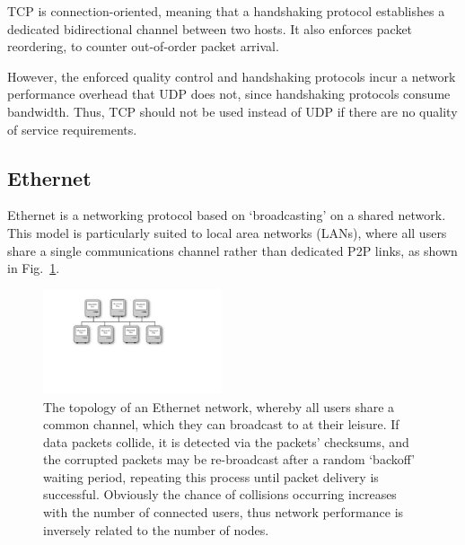 TCP is connection-oriented, meaning that a handshaking protocol establishes a dedicated bidirectional channel between two hosts. It also enforces packet reordering, to counter out-of-order packet arrival.

However, the enforced quality control and handshaking protocols incur a network performance overhead that UDP does not, since handshaking protocols consume bandwidth. Thus, TCP should not be used instead of UDP if there are no quality of service requirements.

%
%

\subsection{Ethernet} 

Ethernet is a networking protocol based on `broadcasting' on a shared network. This model is particularly suited to local area networks (LANs), where all users share a single communications channel rather than dedicated P2P links, as shown in Fig.~\ref{fig:ethernet}.

\begin{figure}[!htb]
	\includegraphics[width=0.47\textwidth]{ethernet}
	\caption{The topology of an Ethernet network, whereby all users share a common channel, which they can broadcast to at their leisure. If data packets collide, it is detected via the packets' checksums, and the corrupted packets may be re-broadcast after a random `backoff' waiting period, repeating this process until packet delivery is successful. Obviously the chance of collisions occurring increases with the number of connected users, thus network performance is inversely related to the number of nodes.} \label{fig:ethernet}
\end{figure}

